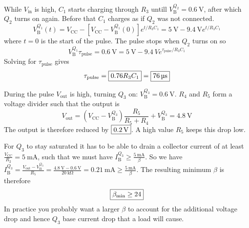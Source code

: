 While $V_\text{in}$ is high, $C_1$ starts charging through $R_3$ untill $V^{Q_2}_\text{B}=\SI{0.6}{\V}$, after which $Q_2$ turns on again.
Before that $C_1$ charges as if $Q_2$ was not connected.
\[V^{Q_1}_\text{B}(t) = V_\text{CC}-[V_\text{CC}-V^{Q_1}_\text{B}(0)] e^{t/R_3C_1} = \SI{5}{\V}-\SI{9.4}{\V} e^{t/R_3C_1}\]
where $t=0$ is the start of the pulse.
The pulse stops when $Q_2$ turns on so
\[V^{Q_1}_\text{B}{\tau_\text{pulse}}=\SI{0.6}{\V} = \SI{5}{\V}-\SI{9.4}{V} e^{\tau_\text{pulse}/R_3C_1}\]
Solving for $\tau_\text{pulse}$ gives
\[\tau_\text{pulse} = \mans{0.76 R_3 C_1} = \mans{\SI{76}{\us}}\]

During the pulse $V_\text{out}$ is high, turning $Q_3$ on: $V^{Q_3}_\text{B} = \SI{0.6}{\V}$.
$R_4$ and $R_5$ form a voltage divider such that the output is
\[V_\text{out} = (V_\text{CC}-V^{Q_3}_\text{B})\frac{R_5}{R_5+R_4}+V^{Q_3}_\text{B} = \SI{4.8}{\V}\]
The output is therefore reduced by $\mans{\SI{0.2}{\V}}$. A high value $R_5$ keeps this drop low.

For $Q_3$ to stay saturated it has to be able to drain a collector current of at least $\frac{V_\text{CC}}{R_2}=\SI{5}{\mA}$, such that we must have $I^{Q_3}_\text{B} \geq \frac{\SI{5}{\mA}}{\beta}$. So we have $I^{Q_3}_\text{B} = \frac{V_\text{out}-V^{Q_3}_\text{B}}{R_5} = \frac{\SI{4.8}{\V}-\SI{0.6}{\V}}{\SI{20}{\kohm}} = \SI{0.21}{\mA} \geq \frac{\SI{5}{\mA}}{\beta}$.
The resulting minimum $\beta$ is therefore
\[\boxed{\beta_\text{min} \geq 24}\]
In practice you probably want a larger $\beta$ to account for the additional voltage drop and hence $Q_3$ base current drop that a load will cause.





























